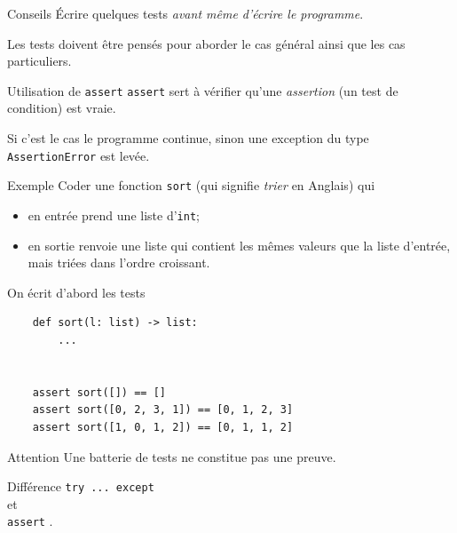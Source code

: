 \documentclass[10pt]{nsibeamer}
\begin{document}
\begin{frame}[fragile]{Conseils}\pause
    Écrire quelques tests \textit{avant même d'écrire le programme}.\\\CurrentFilePathUsed
    
    Les tests doivent être pensés pour aborder le cas général ainsi que les cas particuliers.
\end{frame}

\begin{frame}[fragile]{Utilisation de \texttt{assert}}\pause
    \texttt{assert} sert à vérifier qu'une \textit{assertion} (un test de condition) est vraie.\\\pause
    
    Si c'est le cas le programme continue, sinon une exception du type \texttt{AssertionError} est levée.
    
\end{frame}

\begin{frame}[fragile]{Exemple}\pause
    Coder une fonction \texttt{sort} (qui signifie \textit{trier} en Anglais) qui     
    \begin{itemize}
        \item   en entrée prend une liste d'\texttt{int};
        \item   en sortie renvoie une liste qui contient les mêmes valeurs que la liste d'entrée, mais triées dans l'ordre croissant.
    \end{itemize}
\end{frame}

\begin{frame}[fragile]{On écrit d'abord les tests}\pause
    
    \begin{verbatim}
    def sort(l: list) -> list:
        ...


    assert sort([]) == []
    assert sort([0, 2, 3, 1]) == [0, 1, 2, 3]
    assert sort([1, 0, 1, 2]) == [0, 1, 1, 2]
    \end{verbatim}
\end{frame}

\begin{frame}[fragile]{Attention}
    Une batterie de tests ne constitue pas une preuve.
\end{frame}

\begin{frame}[standout]
    Différence \texttt{try ... except}\\
    et\\
    \texttt{assert} . 
\end{frame}
\end{document}
